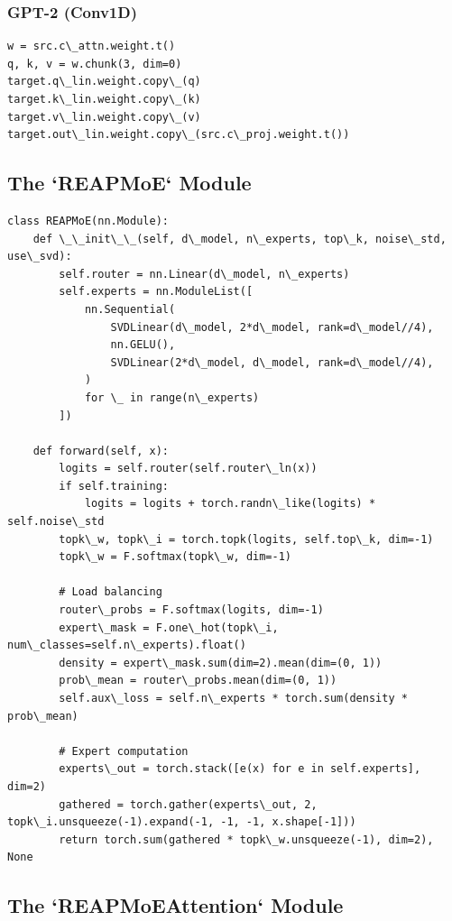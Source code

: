 \subsubsection{GPT-2 (Conv1D)}

\begin{lstlisting}
w = src.c\_attn.weight.t()
q, k, v = w.chunk(3, dim=0)
target.q\_lin.weight.copy\_(q)
target.k\_lin.weight.copy\_(k)
target.v\_lin.weight.copy\_(v)
target.out\_lin.weight.copy\_(src.c\_proj.weight.t())
\end{lstlisting}

\subsection{The `REAPMoE` Module}

\begin{lstlisting}
class REAPMoE(nn.Module):
    def \_\_init\_\_(self, d\_model, n\_experts, top\_k, noise\_std, use\_svd):
        self.router = nn.Linear(d\_model, n\_experts)
        self.experts = nn.ModuleList([
            nn.Sequential(
                SVDLinear(d\_model, 2*d\_model, rank=d\_model//4),
                nn.GELU(),
                SVDLinear(2*d\_model, d\_model, rank=d\_model//4),
            )
            for \_ in range(n\_experts)
        ])
    
    def forward(self, x):
        logits = self.router(self.router\_ln(x))
        if self.training:
            logits = logits + torch.randn\_like(logits) * self.noise\_std
        topk\_w, topk\_i = torch.topk(logits, self.top\_k, dim=-1)
        topk\_w = F.softmax(topk\_w, dim=-1)
        
        # Load balancing
        router\_probs = F.softmax(logits, dim=-1)
        expert\_mask = F.one\_hot(topk\_i, num\_classes=self.n\_experts).float()
        density = expert\_mask.sum(dim=2).mean(dim=(0, 1))
        prob\_mean = router\_probs.mean(dim=(0, 1))
        self.aux\_loss = self.n\_experts * torch.sum(density * prob\_mean)
        
        # Expert computation
        experts\_out = torch.stack([e(x) for e in self.experts], dim=2)
        gathered = torch.gather(experts\_out, 2, topk\_i.unsqueeze(-1).expand(-1, -1, -1, x.shape[-1]))
        return torch.sum(gathered * topk\_w.unsqueeze(-1), dim=2), None
\end{lstlisting}

\subsection{The `REAPMoEAttention` Module}

